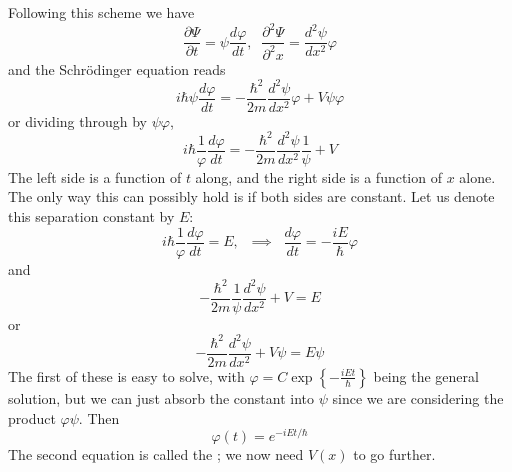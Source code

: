 \documentclass[12pt, a4paper, oneside, openright, titlepage]{book}
\begin{document}
Following this scheme we have $$\frac{\partial \Psi}{\partial t} = \psi\frac{d\varphi}{dt},\;\;\frac{\partial^2\Psi}{\partial^2x} = \frac{d^2\psi}{dx^2}\varphi$$
and the Schr\"{o}dinger equation reads $$i\hbar\psi\frac{d\varphi}{dt} = -\frac{\hbar^2}{2m}\frac{d^2\psi}{dx^2}\varphi+V\psi\varphi$$
or dividing through by $\psi\varphi$, $$i\hbar\frac{1}{\varphi}\frac{d\varphi}{dt} = -\frac{\hbar^2}{2m}\frac{d^2\psi}{dx^2}\frac{1}{\psi}+V$$
The left side is a function of $t$ along, and the right side is a function of $x$ alone. The only way this can possibly hold is if both sides are constant. Let us denote this separation constant by $E$: \begin{equation*}
    i\hbar\frac{1}{\varphi}\frac{d\varphi}{dt} = E,\;\;\implies\;\;\frac{d\varphi}{dt} = -\frac{iE}{\hbar}\varphi
\end{equation*}
and $$-\frac{\hbar^2}{2m}\frac{1}{\psi}\frac{d^2\psi}{dx^2}+V=E$$ or $$\boxed{-\frac{\hbar^2}{2m}\frac{d^2\psi}{dx^2} + V\psi = E\psi}$$
The first of these is easy to solve, with $\varphi = C\exp\left\{-\frac{iEt}{\hbar}\right\}$ being the general solution, but we can just absorb the constant into $\psi$ since we are considering the product $\varphi\psi$. Then $$\varphi(t) = e^{-iEt/\hbar}$$ The second equation is called the ; we now need $V(x)$ to go further.
\end{document}
